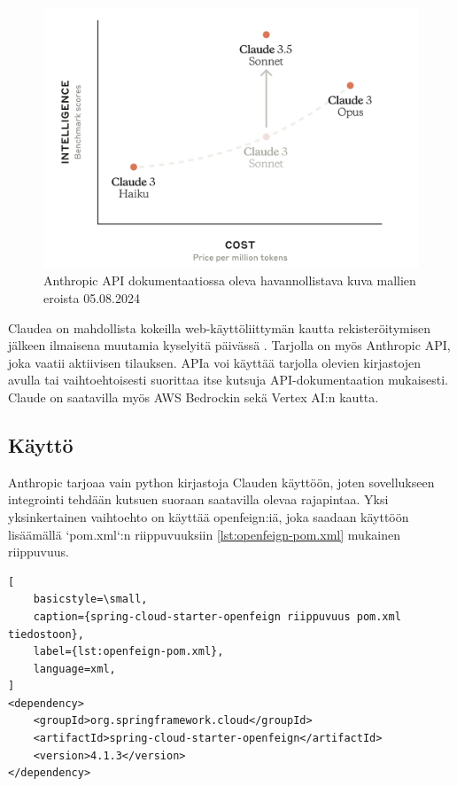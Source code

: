 \begin{figure}[H]
  \includegraphics[width=\textwidth]{figures/3-5-sonnet-curve.png}
  \caption{Anthropic API dokumentaatiossa oleva havannollistava kuva mallien eroista 05.08.2024}
  \label{fig:3-5-sonnet-curve}
\end{figure}

Claudea on mahdollista kokeilla web-käyttöliittymän kautta rekisteröitymisen
jälkeen ilmaisena muutamia kyselyitä päivässä \parencite{claudeChat}. Tarjolla
on myös Anthropic API, joka vaatii aktiivisen tilauksen. APIa voi käyttää
tarjolla olevien kirjastojen avulla tai vaihtoehtoisesti suorittaa itse kutsuja
API-dokumentaation mukaisesti. Claude on saatavilla myös AWS Bedrockin sekä
Vertex AI:n kautta. \parencite{anthropicAPIDocs}

\subsection{Käyttö}
\label{ch:claude-usage}

Anthropic tarjoaa vain python kirjastoja Clauden käyttöön, joten sovellukseen
integrointi tehdään kutsuen suoraan saatavilla olevaa rajapintaa. Yksi
yksinkertainen vaihtoehto on käyttää openfeign:iä, joka saadaan käyttöön
lisäämällä `pom.xml`:n riippuvuuksiin \ref{lst:openfeign-pom.xml} mukainen
riippuvuus.

\begin{lstlisting}[
    basicstyle=\small,
    caption={spring-cloud-starter-openfeign riippuvuus pom.xml tiedostoon},
    label={lst:openfeign-pom.xml},
    language=xml,
]
<dependency>
    <groupId>org.springframework.cloud</groupId>
    <artifactId>spring-cloud-starter-openfeign</artifactId>
    <version>4.1.3</version>
</dependency>
\end{lstlisting}

